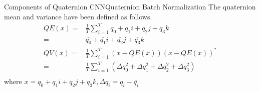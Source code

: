 \documentclass{beamer}
\begin{document}


\begin{frame}{Components of Quaternion CNN}{Quaternion Batch Normalization}
The quaternion mean and variance have been defined as follows.
\begin{equation}
    \begin{split}
        QE(x)=&\frac{1}{T}\sum_{i=1}^T q_0+q_1i+q_2j+q_3k\\
            =& \overline{q_0} +\overline{q_1} i+\overline{q_2} j+\overline{q_3} k\\
        QV(x)=&\frac{1}{T}\sum_{i=1}^T(x-QE(x))(x-QE(x))^*\\
            =&\frac{1}{T}\sum_{i=1}^T(\Delta q_0^2+\Delta q_1^2+\Delta q_2^2+\Delta q_3^2)\\
    \end{split}
\end{equation}
where $x=q_0+q_1i+q_2j+q_3k, \Delta q_i =q_i-\overline{q_i} $ 
\end{frame}
\end{document}
